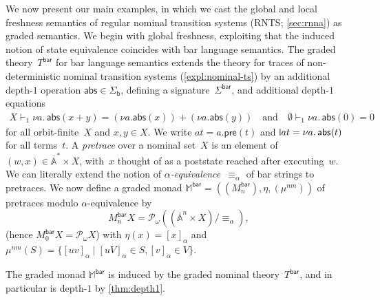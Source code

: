 \documentclass[a4paper,UKenglish,cleveref,thm-restate,numberwithinsect,final]{lipics-v2021}
\newcommand{\Br}{\mathsf{bar}}
\newcommand{\pre}{\mathsf{pre}}
\newcommand{\abs}{\mathsf{abs}}
\newcommand{\Term}{\mathsf{Term}}
\newcommand{\sigb}{\Sigma_{\mathsf b}}
\newcommand{\Names}{\mathbb{A}}
\newcommand{\barNames}{\overline{\Names}}
\newcommand{\alphaeq}{\equiv_\alpha}
\newcommand{\pow}{\mathcal{P}}
\newcommand{\powf}{\pow_{\omega}}
\theoremstyle{plain}
\newcommand{\midmid}{\hspace{0.2ex}{\rule[-0.1ex]{0.6pt}{1.65ex}}\hspace{0.2ex}}
\newcommand{\newletter}[1]{{\midmid}#1}
\numberwithin{equation}{section}
\newcommand{\monad}{{\mathbb{M}}}
\newcommand{\+}[1]{\mathcal{#1}\xspace}
\theoremstyle{definition}
\begin{document}
\noindent We now present our main examples, in which we cast the
global and local freshness semantics of regular nominal transition
systems (RNTS; \cref{sec:rnna}) as graded semantics. We begin with
global freshness, exploiting that the induced notion of state
equivalence coincides with bar language semantics. The graded
theory~$T^{\Br}$ for bar language semantics extends the theory for
traces of non-deterministic nominal transition systems
(\cref{expl:nominal-ts}) by an additional depth-$1$ operation
$\abs\in\sigb$, defining a signature~$\Sigma^{\Br}$, and additional
depth-$1$ equations
\begin{gather}
  X\vdash_1\nu a.\,\abs(x+y)=(\nu a.\abs(x))+(\nu a.\abs(y))
  \quad\text{and}\quad
  \emptyset\vdash_1\nu a.\,\abs(0)=0 \label{ax:distributivity-abs}
\end{gather}
for all orbit-finite~$X$ and $x,y\in X$. We write
$at=a.\pre(t)$ and $\newletter at=\nu a.\,\abs(t)$ for all
terms~$t$. A \emph{pretrace} over a nominal set~$X$ is an element of
$(w,x)\in\barNames^*\times X$, with~$x$ thought of as a poststate
reached after executing~$w$. We can literally extend the notion of
\emph{$\alpha$-equivalence}~$\alphaeq$ of bar strings to pretraces.
We now define a graded monad $\monad^\Br=((M^\Br_n),\eta,(\mu^{nm}))$
of pretraces modulo $\alpha$-equivalence by
\begin{equation*}
  M^\Br_nX=\powf((\barNames^n\times X)/\alphaeq),
\end{equation*}
(hence $M^\Br_0X=\powf X$) with $\eta(x)=[x]_\alpha$ and
$\mu^{nm}(S)=\{[uv]_\alpha\mid [uV]_\alpha\in S,[v]_\alpha\in V\}$.
\begin{theorem}\label{thm:global-freshness-monad}
  The graded monad $\monad^\Br$ is induced by the graded nominal
  theory~$T^\Br$, and in particular is depth-$1$ by \cref{thm:depth1}.
\end{theorem}
\end{document}

